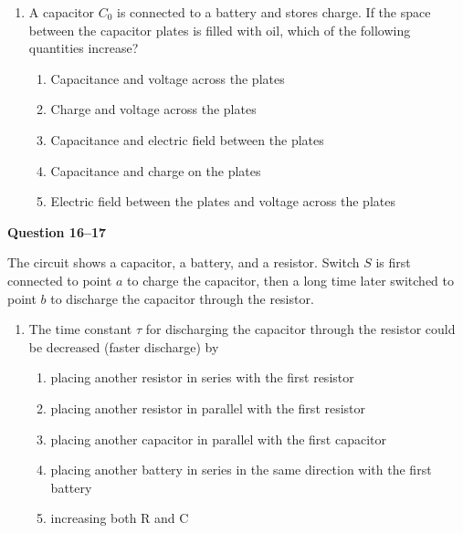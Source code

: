 \documentclass{../../oss-apphys}
\begin{document}
\begin{multicols}{2}
\begin{enumerate}[leftmargin=18pt,resume]
  \item A capacitor $C_0$ is connected to a battery and stores charge. If the
    space between the capacitor plates is filled with oil, which of the
    following quantities increase?
    \begin{enumerate}[noitemsep,topsep=0pt,leftmargin=18pt,label=(\Alph*)]
    \item Capacitance and voltage across the plates
    \item Charge and voltage across the plates
    \item Capacitance and electric field between the plates
    \item Capacitance and charge on the plates
    \item Electric field between the plates and voltage across the plates
    \end{enumerate}
  \end{enumerate}

  \columnbreak
  
  \textbf{Question 16--17}
  
  The circuit shows a capacitor, a battery, and a resistor. Switch $S$ is first
  connected to point $a$ to charge the capacitor, then a long time later
  switched to point $b$ to discharge the capacitor through the resistor.
  \begin{center}
  \end{center}
  
  \begin{enumerate}[leftmargin=18pt,resume]
  \item The time constant $\tau$ for discharging the capacitor through the
    resistor could be decreased (faster discharge) by
    \begin{enumerate}[noitemsep,topsep=0pt,leftmargin=18pt,label=(\Alph*)]
    \item placing another resistor in series with the first resistor
    \item placing another resistor in parallel with the first resistor
    \item placing another capacitor in parallel with the first capacitor
    \item placing another battery in series in the same direction with the
      first battery
    \item increasing both R and C
    \end{enumerate}


\end{enumerate}
\end{multicols}
\end{document}
